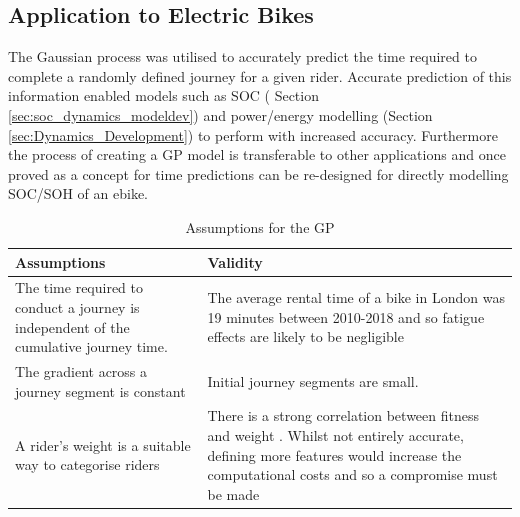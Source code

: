 \documentclass[a4paper, 10pt]{article}
\numberwithin{equation}{section}
\begin{document}
\subsection{Application to Electric Bikes}

The Gaussian process was utilised to accurately predict the time required to complete a randomly defined journey for a given rider. Accurate prediction of this information enabled models such as SOC ( Section \ref{sec:soc_dynamics_modeldev}) and power/energy modelling (Section \ref{sec:Dynamics_Development}) to perform with increased accuracy. Furthermore the process of creating a GP model is transferable to other applications and once proved as a concept for time predictions can be re-designed for directly modelling SOC/SOH of an ebike. 


\begin{table}[h!]
\caption{Assumptions for the GP}
\label{tbl:GP_Assumptions}
\begin{tabular}{|p{}|p{}|}
\hline
Assumptions & Validity \\ \hline
The time required to conduct a journey is independent 
of the cumulative journey time.                     &   The average rental time of a bike in London was 19 minutes                                                             between 2010-2018 and so fatigue effects are likely to be negligible \cite{tfl}           \\
The gradient across a journey segment is constant   & Initial journey segments are small. \\
A rider's weight is a suitable way to categorise riders & There is a strong correlation between fitness and weight  \cite{}. Whilst not entirely accurate, defining more features would increase the computational costs and so a compromise must be made\\
    
\hline
\end{tabular}
\end{table}
\end{document}
